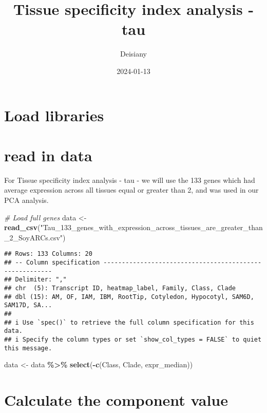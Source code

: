\documentclass[
]{article}
\title{Tissue specificity index analysis - tau}
\author{Deisiany}
\date{2024-01-13}
\newenvironment{Shaded}{\begin{snugshade}}{\end{snugshade}}
\newcommand{\CommentTok}[1]{\textcolor[rgb]{0.56,0.35,0.01}{\textit{#1}}}
\newcommand{\FunctionTok}[1]{\textcolor[rgb]{0.13,0.29,0.53}{\textbf{#1}}}
\newcommand{\NormalTok}[1]{#1}
\newcommand{\OtherTok}[1]{\textcolor[rgb]{0.56,0.35,0.01}{#1}}
\newcommand{\SpecialCharTok}[1]{\textcolor[rgb]{0.81,0.36,0.00}{\textbf{#1}}}
\newcommand{\StringTok}[1]{\textcolor[rgb]{0.31,0.60,0.02}{#1}}
\begin{document}
\maketitle

\hypertarget{load-libraries}{%
\section{Load libraries}\label{load-libraries}}

\hypertarget{read-in-data}{%
\section{read in data}\label{read-in-data}}

For Tissue specificity index analysis - tau - we will use the 133 genes
which had average expression across all tissues equal or greater than 2,
and was used in our PCA analysis.

\begin{Shaded}
\begin{Highlighting}[]
\CommentTok{\# Load full genes}
\NormalTok{data }\OtherTok{\textless{}{-}} \FunctionTok{read\_csv}\NormalTok{(}\StringTok{"Tau\_133\_genes\_with\_expression\_across\_tissues\_are\_greater\_than\_2\_SoyARCs.csv"}\NormalTok{) }
\end{Highlighting}
\end{Shaded}

\begin{verbatim}
## Rows: 133 Columns: 20
## -- Column specification --------------------------------------------------------
## Delimiter: ","
## chr  (5): Transcript ID, heatmap_label, Family, Class, Clade
## dbl (15): AM, OF, IAM, IBM, RootTip, Cotyledon, Hypocotyl, SAM6D, SAM17D, SA...
## 
## i Use `spec()` to retrieve the full column specification for this data.
## i Specify the column types or set `show_col_types = FALSE` to quiet this message.
\end{verbatim}

\begin{Shaded}
\begin{Highlighting}[]
\NormalTok{data }\OtherTok{\textless{}{-}}\NormalTok{ data }\SpecialCharTok{\%\textgreater{}\%} \FunctionTok{select}\NormalTok{(}\SpecialCharTok{{-}}\FunctionTok{c}\NormalTok{(Class, Clade, expr\_median))}
\end{Highlighting}
\end{Shaded}

\hypertarget{calculate-the-component-value}{%
\section{Calculate the component
value}\label{calculate-the-component-value}}
\end{document}
